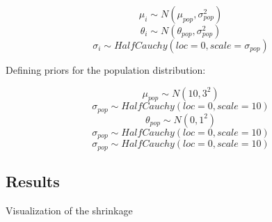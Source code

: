 \documentclass[12pt,a4paper,leqno]{report}
\theoremstyle{plain}
\theoremstyle{definition}
\theoremstyle{remark}
\begin{document}
\begin{def}\label{simulationmodel}
    \begin{equation}\label{}
        \mu_i \sim N(\mu_{pop}, \sigma_{pop}^2)
    \end{equation}
    \begin{equation}\label{}
        \theta_i \sim N(\theta_{pop}, \sigma_{pop}^2)
    \end{equation}
    \begin{equation}\label{}
        \sigma_i \sim HalfCauchy(loc=0, scale=\sigma_{pop})
    \end{equation}
\end{def}

Defining priors for the population distribution:

\begin{def}\label{population_priors}
    \begin{equation}\label{}
        \mu_{pop} \sim N(10, 3^2)
    \end{equation}
    \begin{equation}\label{}
        \sigma_{pop} \sim HalfCauchy(loc=0, scale=10)
    \end{equation}
    \begin{equation}\label{}
        \theta_{pop} \sim N(0, 1^2)
    \end{equation}
    \begin{equation}\label{}
        \sigma_{pop} \sim HalfCauchy(loc=0, scale=10)
    \end{equation}
    \begin{equation}\label{}
        \sigma_{pop} \sim HalfCauchy(loc=0, scale=10)
    \end{equation}
\end{def}

\subsection{Results}\label{hierresults}

Visualization of the shrinkage

\end{document}
